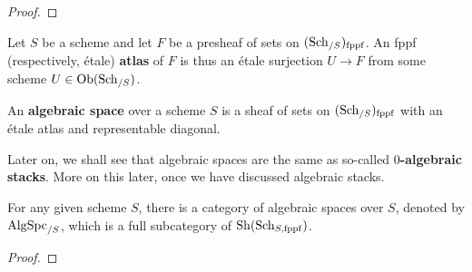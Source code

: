                 \begin{proof}
                    
                \end{proof}
                
            \begin{definition}[Atlases] \label{def: atlases}
                Let $S$ be a scheme and let $F$ be a presheaf of sets on $(\mathrm{Sch}_{/S})_{\mathrm{fppf}}$. An fppf (respectively, \'etale) \textbf{atlas} of $F$ is thus an \'etale surjection $U \to F$ from some scheme $U \in \mathrm{Ob}(\mathrm{Sch}_{/S})$.
            \end{definition}
            \begin{definition} \label{def: algebraic_spaces}
                An \textbf{algebraic space} over a scheme $S$ is a sheaf of sets on $(\mathrm{Sch}_{/S})_{\mathrm{fppf}}$ with an \'etale atlas and representable diagonal.
            \end{definition}
            \begin{remark}
                Later on, we shall see that algebraic spaces are the same as so-called \textbf{$0$-algebraic stacks}. More on this later, once we have discussed algebraic stacks.
            \end{remark}
            \begin{proposition} \label{prop: the_category_of_algebraic_spaces}
                For any given scheme $S$, there is a category of algebraic spaces over $S$, denoted by $\mathrm{Alg}\mathrm{Spc}_{/S}$, which is a full subcategory of $\mathrm{Sh}(\mathrm{Sch}_{S, \mathrm{fppf}})$. 
            \end{proposition}
                \begin{proof}
                    
                \end{proof}
                
